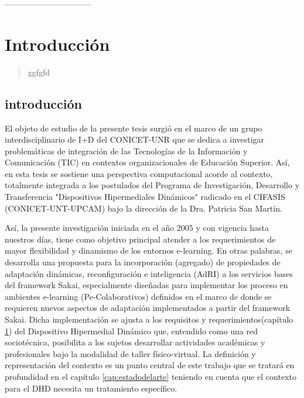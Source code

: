 --------------------------------
\parskip=0.6cm

\chapter{Introducción}\label{cap:1} 


\begin{abstract}
ggfgfd

\end{abstract}


\section{introducción}

El objeto de estudio de la presente tesis surgió en el marco de un grupo interdisciplinario de I+D del CONICET-UNR que se dedica a investigar problemáticas de integración de las Tecnologías de la Información y Comunicación (TIC) en contextos organizacionales de Educación Superior. Así, en esta tesis se sostiene una perspectiva computacional acorde al contexto, totalmente integrada a los postulados del Programa de Investigación, Desarrollo y Transferencia "Dispositivos Hipermediales Dinámicos" radicado en el CIFASIS (CONICET-UNT-UPCAM) bajo la dirección de la Dra. Patricia San Martín.

Así, la presente investigación iniciada en el año 2005 y con vigencia hasta nuestros días, tiene como objetivo principal atender a los requerimientos de mayor flexibilidad y dinamismo de los entornos e-learning. En otras palabras, se desarrolla una propuesta para la incorporación (agregado) de propiedades de adaptación dinámicas, reconfiguración e inteligencia (AdRI) \label{AdRI} a los servicios bases del framework Sakai,
especialmente diseñadas para implementar los proceso en ambientes e-learning (Pe-Colaborativos) definidos en el marco de \cite{cacic2007.9} donde se requieren nuevos aspectos de adaptación \cite{librounq} implementados a partir del framework Sakai. Dicha
implementación se ajusta a los requisitos y requerimientos(capítulo \ref{cap:1}) del Dispositivo Hipermedial Dinámico que, entendido como una red sociotécnica, posibilita a los sujetos desarrollar actividades académicas y profesionales bajo la modalidad de taller físico-virtual. 
La definición y representación del
contexto es un punto central de este trabajo que se tratará en profundidad en el
capítulo \ref{cap:estadodelarte} teniendo en cuenta que el contexto para el DHD necesita un
tratamiento específico.

